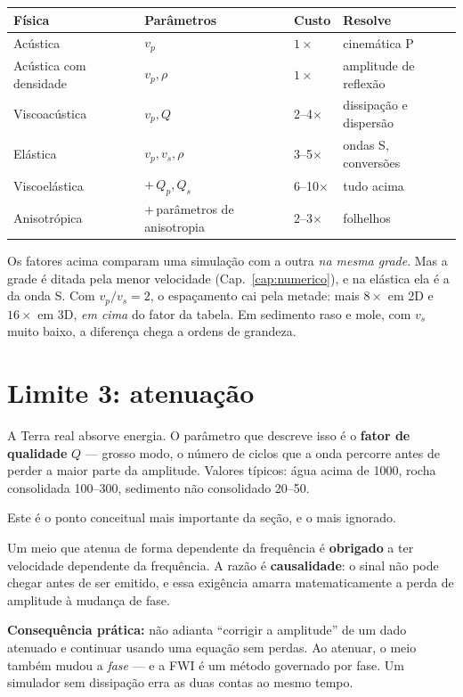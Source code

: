 \documentclass[11pt,a4paper,oneside]{report}
\begin{document}
\begin{center}
\begin{tabular}{@{}llll@{}}
\toprule
\textbf{F\'isica} & \textbf{Par\^ametros} & \textbf{Custo} & \textbf{Resolve} \\
\midrule
Ac\'ustica & $v_p$ & $1\times$ & cinem\'atica P \\
Ac\'ustica com densidade & $v_p,\rho$ & $1\times$ & amplitude de reflex\~ao \\
Viscoac\'ustica & $v_p,Q$ & 2--4$\times$ & dissipa\c{c}\~ao e dispers\~ao \\
El\'astica & $v_p,v_s,\rho$ & 3--5$\times$ & ondas S, convers\~oes \\
Viscoel\'astica & $+\,Q_p,Q_s$ & 6--10$\times$ & tudo acima \\
Anisotr\'opica & $+\,$par\^ametros de anisotropia & 2--3$\times$ & folhelhos \\
\bottomrule
\end{tabular}
\end{center}

\begin{atencao}
Os fatores acima comparam uma simula\c{c}\~ao com a outra \emph{na mesma
grade}. Mas a grade \'e ditada pela menor velocidade
(Cap.~\ref{cap:numerico}), e na el\'astica ela \'e a da onda S. Com
$v_p/v_s = 2$, o espa\c{c}amento cai pela metade: mais $8\times$ em 2D e
$16\times$ em 3D, \emph{em cima} do fator da tabela. Em sedimento raso e mole,
com $v_s$ muito baixo, a diferen\c{c}a chega a ordens de grandeza.
\end{atencao}

\section{Limite 3: atenua\c{c}\~ao}

A Terra real absorve energia. O par\^ametro que descreve isso \'e o
\textbf{fator de qualidade} $Q$ --- grosso modo, o n\'umero de ciclos que a
onda percorre antes de perder a maior parte da amplitude. Valores t\'ipicos:
\'agua acima de 1000, rocha consolidada 100--300, sedimento n\~ao consolidado
20--50.

\begin{teoria}
Este \'e o ponto conceitual mais importante da se\c{c}\~ao, e o mais ignorado.

Um meio que atenua de forma dependente da frequ\^encia \'e \textbf{obrigado} a
ter velocidade dependente da frequ\^encia. A raz\~ao \'e \textbf{causalidade}:
o sinal n\~ao pode chegar antes de ser emitido, e essa exig\^encia amarra
matematicamente a perda de amplitude \`a mudan\c{c}a de fase.

\textbf{Consequ\^encia pr\'atica:} n\~ao adianta ``corrigir a amplitude'' de
um dado atenuado e continuar usando uma equa\c{c}\~ao sem perdas. Ao atenuar,
o meio tamb\'em mudou a \emph{fase} --- e a FWI \'e um m\'etodo governado por
fase. Um simulador sem dissipa\c{c}\~ao erra as duas contas ao mesmo tempo.
\end{teoria}
\end{document}
